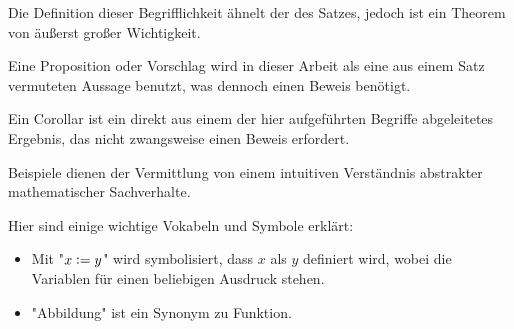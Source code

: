 \theoremstyle{theo}
\begin{theo}
Die Definition dieser Begrifflichkeit ähnelt der des Satzes, jedoch ist ein Theorem von äußerst großer Wichtigkeit.
\end{theo}

\theoremstyle{prop}
\begin{prop}{}
Eine Proposition oder Vorschlag wird in dieser Arbeit als eine aus einem Satz vermuteten Aussage benutzt, was dennoch einen Beweis benötigt.
\end{prop}

\theoremstyle{Corollar}
\begin{Corollar}
Ein Corollar ist ein direkt aus einem der hier aufgeführten Begriffe abgeleitetes Ergebnis, das nicht zwangsweise einen Beweis erfordert.
\end{Corollar}

\theoremstyle{example}
\begin{example}
Beispiele dienen der Vermittlung von einem intuitiven Verständnis abstrakter mathematischer Sachverhalte.
\end{example}

Hier sind einige wichtige Vokabeln und Symbole erklärt:
\begin{itemize}
\item Mit "$x\vcentcolon=y$" wird symbolisiert, dass $x$ als $y$ definiert wird, wobei die Variablen für einen beliebigen Ausdruck stehen.
\item "Abbildung" ist ein Synonym zu Funktion.
\end{itemize}







